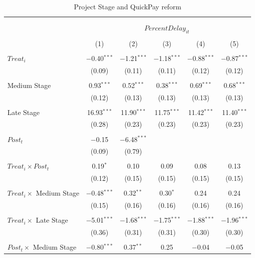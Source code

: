 \documentclass[
]{article}
\begin{document}
\begin{table}[H] \centering 
  \caption{Project Stage and QuickPay reform} 
  \label{} 
\small 
\begin{tabular}{@{\extracolsep{-2pt}}lccccc} 
\\[-1.8ex]\hline 
\hline \\[-1.8ex] 
\\[-1.8ex] & \multicolumn{5}{c}{$PercentDelay_{it}$  } \\ 
\\[-1.8ex] & (1) & (2) & (3) & (4) & (5)\\ 
\hline \\[-1.8ex] 
 $Treat_i$ & $-$0.40$^{***}$ & $-$1.21$^{***}$ & $-$1.18$^{***}$ & $-$0.88$^{***}$ & $-$0.87$^{***}$ \\ 
  & (0.09) & (0.11) & (0.11) & (0.12) & (0.12) \\ 
  & & & & & \\ 
 Medium Stage & 0.93$^{***}$ & 0.52$^{***}$ & 0.38$^{***}$ & 0.69$^{***}$ & 0.68$^{***}$ \\ 
  & (0.12) & (0.13) & (0.13) & (0.13) & (0.13) \\ 
  & & & & & \\ 
 Late Stage & 16.93$^{***}$ & 11.90$^{***}$ & 11.75$^{***}$ & 11.42$^{***}$ & 11.40$^{***}$ \\ 
  & (0.28) & (0.23) & (0.23) & (0.23) & (0.23) \\ 
  & & & & & \\ 
 $Post_t$ & $-$0.15 & $-$6.48$^{***}$ &  &  &  \\ 
  & (0.09) & (0.79) &  &  &  \\ 
  & & & & & \\ 
 $Treat_i \times Post_t$ & 0.19$^{*}$ & 0.10 & 0.09 & 0.08 & 0.13 \\ 
  & (0.12) & (0.15) & (0.15) & (0.15) & (0.15) \\ 
  & & & & & \\ 
 $Treat_i \times$ Medium Stage & $-$0.48$^{***}$ & 0.32$^{**}$ & 0.30$^{*}$ & 0.24 & 0.24 \\ 
  & (0.15) & (0.16) & (0.16) & (0.16) & (0.16) \\ 
  & & & & & \\ 
 $Treat_i \times$ Late Stage & $-$5.01$^{***}$ & $-$1.68$^{***}$ & $-$1.75$^{***}$ & $-$1.88$^{***}$ & $-$1.96$^{***}$ \\ 
  & (0.36) & (0.31) & (0.31) & (0.30) & (0.30) \\ 
  & & & & & \\ 
 $Post_t \times$ Medium Stage & $-$0.80$^{***}$ & 0.37$^{**}$ & 0.25 & $-$0.04 & $-$0.05 \\ 

\end{tabular}
\end{table}
\end{document}
